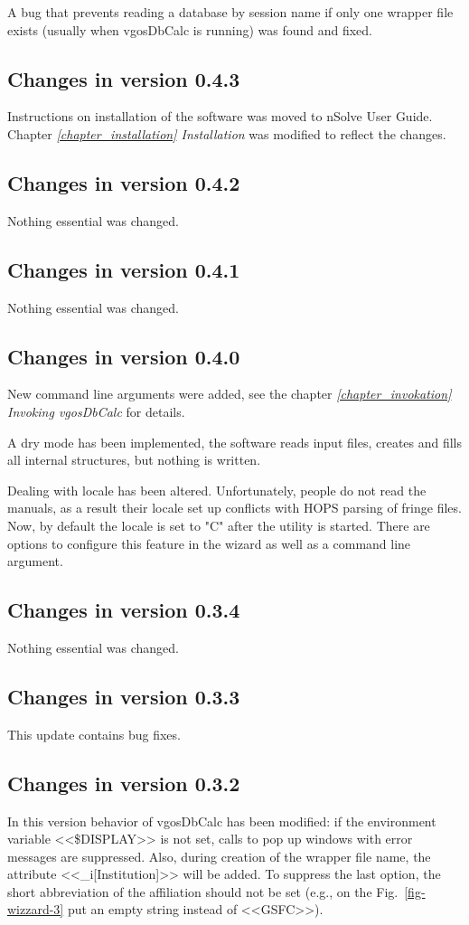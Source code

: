 \documentclass [10pt,letterpaper]{report}
\newcommand{\nuSolve}{\greektext n\latintext Solve}
\begin{document}
A bug that prevents reading a database by session name if only one wrapper file
exists (usually when vgosDbCalc is running) was found and fixed.


\subsection{Changes in version 0.4.3}
Instructions on installation of the software was moved to \nuSolve{} User Guide.
Chapter \emph{\ref{chapter_installation} Installation} was modified to reflect the changes.


\subsection{Changes in version 0.4.2}
Nothing essential was changed.


\subsection{Changes in version 0.4.1}
Nothing essential was changed.


\subsection{Changes in version 0.4.0}
New command line arguments were added, see the chapter
\emph{\ref{chapter_invokation} Invoking vgosDbCalc} for details.

A dry mode has been implemented, the software reads input files, creates and fills
all internal structures, but nothing is written.

Dealing with locale has been altered. Unfortunately, people do not read the manuals,
as a result their locale set up conflicts with HOPS parsing of fringe files. Now,
by default the locale is set to "C" after the utility is started. There are options
to configure this feature in the wizard as well as a command line argument.


\subsection{Changes in version 0.3.4}
Nothing essential was changed.

\subsection{Changes in version 0.3.3}
This update contains bug fixes.

\subsection{Changes in version 0.3.2}
In this version behavior of vgosDbCalc has been modified: if the environment
variable <<\$DISPLAY>> is not set, calls to pop up windows with error messages are
suppressed. Also, during creation of the wrapper file name, the attribute
<<\_i[Institution]>> will be added. To suppress the last option, the short
abbreviation of the affiliation should not be set (e.g., on the Fig.~\ref{fig-wizzard-3}
put an empty string instead of <<GSFC>>).
\end{document}
